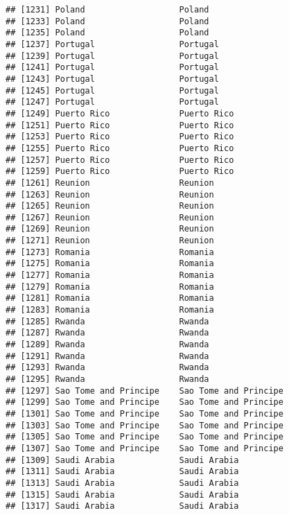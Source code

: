 \documentclass[]{article}
\begin{document}
\begin{verbatim}
## [1231] Poland                   Poland                  
## [1233] Poland                   Poland                  
## [1235] Poland                   Poland                  
## [1237] Portugal                 Portugal                
## [1239] Portugal                 Portugal                
## [1241] Portugal                 Portugal                
## [1243] Portugal                 Portugal                
## [1245] Portugal                 Portugal                
## [1247] Portugal                 Portugal                
## [1249] Puerto Rico              Puerto Rico             
## [1251] Puerto Rico              Puerto Rico             
## [1253] Puerto Rico              Puerto Rico             
## [1255] Puerto Rico              Puerto Rico             
## [1257] Puerto Rico              Puerto Rico             
## [1259] Puerto Rico              Puerto Rico             
## [1261] Reunion                  Reunion                 
## [1263] Reunion                  Reunion                 
## [1265] Reunion                  Reunion                 
## [1267] Reunion                  Reunion                 
## [1269] Reunion                  Reunion                 
## [1271] Reunion                  Reunion                 
## [1273] Romania                  Romania                 
## [1275] Romania                  Romania                 
## [1277] Romania                  Romania                 
## [1279] Romania                  Romania                 
## [1281] Romania                  Romania                 
## [1283] Romania                  Romania                 
## [1285] Rwanda                   Rwanda                  
## [1287] Rwanda                   Rwanda                  
## [1289] Rwanda                   Rwanda                  
## [1291] Rwanda                   Rwanda                  
## [1293] Rwanda                   Rwanda                  
## [1295] Rwanda                   Rwanda                  
## [1297] Sao Tome and Principe    Sao Tome and Principe   
## [1299] Sao Tome and Principe    Sao Tome and Principe   
## [1301] Sao Tome and Principe    Sao Tome and Principe   
## [1303] Sao Tome and Principe    Sao Tome and Principe   
## [1305] Sao Tome and Principe    Sao Tome and Principe   
## [1307] Sao Tome and Principe    Sao Tome and Principe   
## [1309] Saudi Arabia             Saudi Arabia            
## [1311] Saudi Arabia             Saudi Arabia            
## [1313] Saudi Arabia             Saudi Arabia            
## [1315] Saudi Arabia             Saudi Arabia            
## [1317] Saudi Arabia             Saudi Arabia            

\end{verbatim}
\end{document}
